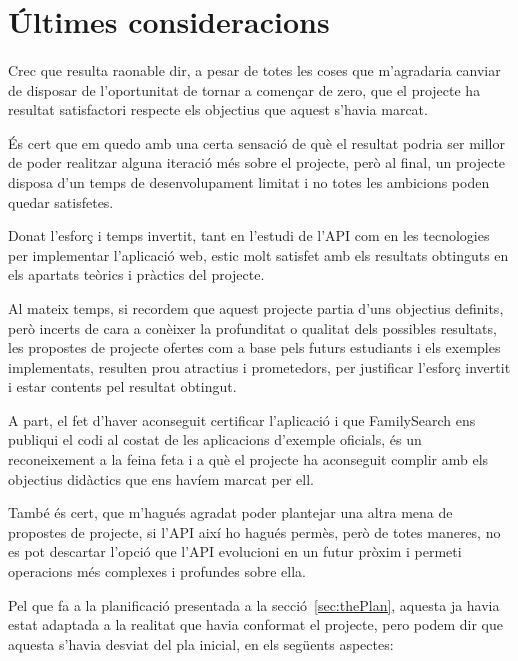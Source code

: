 \section{Últimes consideracions}

    \paragraph{}
    Crec que resulta raonable dir, a pesar de totes les coses que m’agradaria canviar de disposar de l’oportunitat de tornar a començar de zero, que el projecte ha resultat satisfactori respecte els objectius que aquest s’havia marcat.

    És cert que em quedo amb una certa sensació de què el resultat podria ser millor de poder realitzar alguna iteració més sobre el projecte, però al final, un projecte disposa d’un temps de desenvolupament limitat i no totes les ambicions poden quedar satisfetes.

    Donat l’esforç i temps invertit, tant en l’estudi de l’API com en les tecnologies per implementar l’aplicació web, estic molt satisfet amb els resultats obtinguts en els apartats teòrics i pràctics del projecte.

    Al mateix temps, si recordem que aquest projecte partia d’uns objectius definits, però incerts de cara a conèixer la profunditat o qualitat dels possibles resultats, les propostes de projecte ofertes com a base pels futurs estudiants i els exemples implementats, resulten prou atractius i prometedors, per justificar l’esforç invertit i estar contents pel resultat obtingut.

    A part, el fet d'haver aconseguit certificar l'aplicació i que FamilySearch ens publiqui el codi al costat de les aplicacions d'exemple oficials, és un reconeixement a la feina feta i a què el projecte ha aconseguit complir amb els objectius didàctics que ens havíem marcat per ell.

    També és cert, que m’hagués agradat poder plantejar una altra mena de propostes de projecte, si l’API així ho hagués permès, però de totes maneres, no es pot descartar l’opció que l’API evolucioni en un futur pròxim i permeti operacions més complexes  i profundes sobre ella.

    Pel que fa a la planificació presentada a la secció~\ref{sec:thePlan}, aquesta ja havia estat adaptada a la realitat que havia conformat el projecte, pero podem dir que aquesta s'havia desviat del pla inicial, en els següents aspectes:

